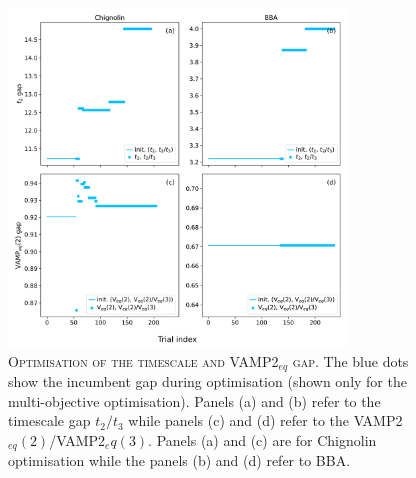\documentclass{article}
\begin{document}
\begin{figure}[ht]
    \centering
    \includegraphics[width=0.8\textwidth]{SI_figures/optimisation_gap_summary.pdf}
    \caption{\textsc{Optimisation of the timescale and VAMP2$_{eq}$ gap.} The blue dots show the incumbent gap during optimisation (shown only for the multi-objective optimisation). Panels (a) and (b) refer to the timescale gap $t_2/t_3$ while panels (c) and (d) refer to the VAMP2$_{eq}(2)$/VAMP2$_eq(3)$. Panels (a) and (c) are for Chignolin optimisation while the panels (b) and (d) refer to BBA.}
    \label{fig:gap_optimiation}
\end{figure}

\FloatBarrier
\clearpage


\end{document}
